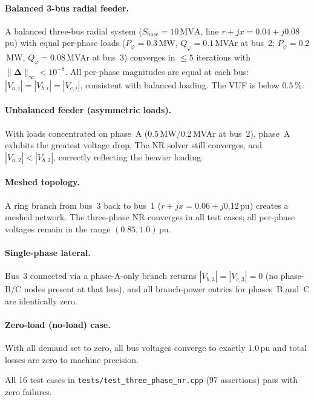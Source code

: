 \paragraph{Balanced 3-bus radial feeder.}
A balanced three-bus radial system ($S_{\text{base}} = 10\,\text{MVA}$,
line $r + jx = 0.04 + j0.08$\,pu) with equal per-phase loads
($P_\varphi = 0.3$\,MW, $Q_\varphi = 0.1$\,MVAr at bus~2;
 $P_\varphi = 0.2$\,MW, $Q_\varphi = 0.08$\,MVAr at bus~3)
converges in $\leq 5$ iterations with $\|\boldsymbol{\Delta}\|_\infty < 10^{-8}$.
All per-phase magnitudes are equal at each bus:
$|V_{a,i}| = |V_{b,i}| = |V_{c,i}|$, consistent with balanced loading.
The VUF is below $0.5\,\%$.

\paragraph{Unbalanced feeder (asymmetric loads).}
With loads concentrated on phase~A (0.5\,MW/0.2\,MVAr at bus~2),
phase~A exhibits the greatest voltage drop.  The NR solver still
converges, and $|V_{a,2}| < |V_{b,2}|$, correctly reflecting the
heavier loading.

\paragraph{Meshed topology.}
A ring branch from bus~3 back to bus~1 ($r + jx = 0.06 + j0.12$\,pu)
creates a meshed network.  The three-phase NR converges in all test cases; all per-phase voltages
remain in the range $(0.85, 1.0)$\,pu.

\paragraph{Single-phase lateral.}
Bus~3 connected via a phase-A-only branch returns
$|V_{b,3}| = |V_{c,3}| = 0$ (no phase-B/C nodes present at that bus),
and all branch-power entries for phases~B and~C are identically zero.

\paragraph{Zero-load (no-load) case.}
With all demand set to zero, all bus voltages converge to exactly
$1.0$\,pu and total losses are zero to machine precision.

\noindent
All 16 test cases in \texttt{tests/test\_three\_phase\_nr.cpp}
(97 assertions) pass with zero failures.
